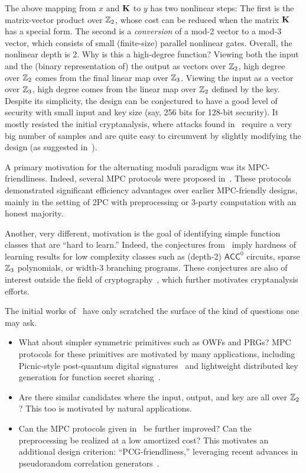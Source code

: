 The above mapping from $x$ and $\mat K$ to $y$ has two nonlinear steps: The first is the matrix-vector product over $\mathbb{Z}_2$, whose cost can be reduced when the matrix $\mat K$ has a special form. The second is a {\em conversion} of a mod-2 vector to a mod-3 vector, which consists of small  (finite-size) parallel nonlinear gates.  Overall, the nonlinear depth is 2. Why is this a high-degree function? Viewing both the input and the (binary representation of) the output as vectors over $\mathbb{Z}_2$, high degree over $\mathbb{Z}_2$ comes from the final linear map over $\mathbb{Z}_3$. Viewing the input as a vector over $\mathbb{Z}_3$, high degree comes from the linear map over $\mathbb{Z}_2$ defined by the key.  Despite its simplicity, the design can be conjectured to have a good level of security with small input and key size (say, 256 bits for 128-bit security). It mostly resisted the initial cryptanalysis, where attacks found in~\cite{cheon2020-adventures} require a very big number of samples and are quite easy to circumvent by slightly modifying the design (as suggested in~\cite{cheon2020-adventures}).

A primary motivation for the alternating moduli paradigm was its MPC-friendliness. Indeed, several MPC protocols were proposed in~\cite{boneh2018-darkmatter}. These protocols demonstrated significant efficiency advantages over earlier MPC-friendly designs, mainly in the setting of 2PC with preprocessing or 3-party computation with an honest majority.

Another, very different, motivation is the goal of identifying simple function classes that are ``hard to learn.''  Indeed,  the conjectures from~\cite{boneh2018-darkmatter} imply hardness of learning results for low complexity classes such as (depth-2) $\mathsf{ACC}^0$ circuits, sparse $\mathbb{Z}_3$ polynomials, or width-3 branching programs. These conjectures are also of interest outside the field of cryptography~\cite{Chen19,FilmusIKK20,ChenR20,KabanetsKLMO20}, which further motivates cryptanalysis efforts.

 The initial works of~\cite{boneh2018-darkmatter,cheon2020-adventures} have only scratched the surface of the kind of questions one may ask.
\begin{itemize}
    \item What about simpler symmetric primitives such as OWFs and PRGs? MPC protocols for these primitives are motivated by many applications, including Picnic-style post-quantum digital signatures~\cite{chase2017-picnic,kales2020-picnic} and lightweight distributed key generation for function secret sharing~\cite{boyle2015-fss}.
    \item Are there similar candidates where the input, output, and key are all over $\mathbb{Z}_2$? This too is motivated by natural applications.
    \item Can the MPC protocols given in~\cite{boneh2018-darkmatter} be further improved? Can the preprocessing be realized at a low amortized cost? This motivates an additional design criterion: ``PCG-friendliness,'' leveraging recent advances in pseudorandom correlation generators~\cite{BCGI18,BCGIKRS19,yang2020-ferret}.
\end{itemize}

